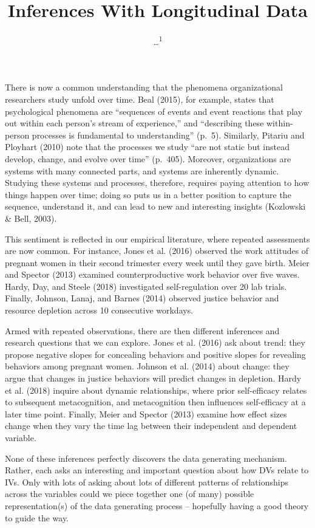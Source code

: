 \documentclass[english,,man]{apa6}
\title{Inferences With Longitudinal Data}
\author{\ldots{}\textsuperscript{1}}
\date{}
\affiliation{
\vspace{0.5cm}
\textsuperscript{1} ...}
\theoremstyle{definition}
\theoremstyle{definition}
\theoremstyle{definition}
\theoremstyle{remark}
\begin{document}
\maketitle

There is now a common understanding that the phenomena organizational
researchers study unfold over time. Beal (2015), for example, states
that psychological phenomena are \enquote{sequences of events and event
reactions that play out within each person's stream of experience,} and
\enquote{describing these within-person processes is fundamental to
understanding} (p.~5). Similarly, Pitariu and Ployhart (2010) note that
the processes we study \enquote{are not static but instead develop,
change, and evolve over time} (p.~405). Moreover, organizations are
systems with many connected parts, and systems are inherently dynamic.
Studying these systems and processes, therefore, requires paying
attention to how things happen over time; doing so puts us in a better
position to capture the sequence, understand it, and can lead to new and
interesting insights (Kozlowski \& Bell, 2003).

This sentiment is reflected in our empirical literature, where repeated
assessments are now common. For instance, Jones et al. (2016) observed
the work attitudes of pregnant women in their second trimester every
week until they gave birth. Meier and Spector (2013) examined
counterproductive work behavior over five waves. Hardy, Day, and Steele
(2018) investigated self-regulation over 20 lab trials. Finally,
Johnson, Lanaj, and Barnes (2014) observed justice behavior and resource
depletion across 10 consecutive workdays.

Armed with repeated observations, there are then different inferences
and research questions that we can explore. Jones et al. (2016) ask
about trend: they propose negative slopes for concealing behaviors and
positive slopes for revealing behaviors among pregnant women. Johnson et
al. (2014) about change: they argue that changes in justice behaviors
will predict changes in depletion. Hardy et al. (2018) inquire about
dynamic relationships, where prior self-efficacy relates to subsequent
metacognition, and metacognition then influences self-efficacy at a
later time point. Finally, Meier and Spector (2013) examine how effect
sizes change when they vary the time lag between their independent and
dependent variable.

None of these inferences perfectly discovers the data generating
mechanism. Rather, each asks an interesting and important question about
how DVs relate to IVs. Only with lots of asking about lots of different
patterns of relationships across the variables could we piece together
one (of many) possible representation(s) of the data generating process
-- hopefully having a good theory to guide the way.
\end{document}

